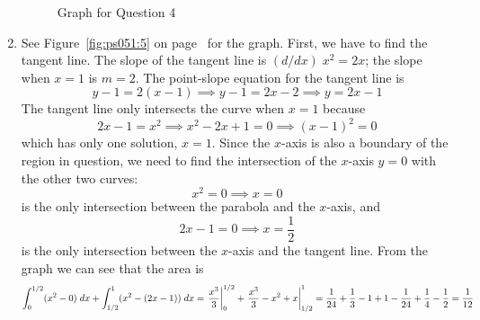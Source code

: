 \documentclass{article}
\begin{document}
\begin{enumerate}
\begin{figure}[htbp]
    \caption{Graph for Question 4}
    \label{fig:ps051:4}
  \end{figure}
\item See Figure~\ref{fig:ps051:5} on page~\pageref{fig:ps051:5} for
  the graph.  First, we have to find the tangent line.  The slope of
  the tangent line is $(d/dx)\; x^2 = 2x$; the slope when $x=1$ is $m=2$.
  The point-slope equation for the tangent line is
  \begin{equation*}
    y - 1 = 2(x-1) \implies y-1 = 2x - 2 \implies y = 2x-1
  \end{equation*}
  The tangent line only intersects the curve when $x=1$ because
  \begin{equation*}
    2x-1 = x^2 \implies x^2 - 2x + 1 = 0 \implies (x-1)^2 = 0
  \end{equation*}
  which has only one solution, $x=1$.  Since the $x$-axis is also a
  boundary of the region in question, we need to find the intersection
  of the $x$-axis $y=0$ with the other two curves:
  \begin{equation*}
    x^2 = 0 \implies x=0
  \end{equation*}
  is the only intersection between the parabola and the $x$-axis, and
  \begin{equation*}
    2x-1 = 0 \implies x= \frac{1}{2}
  \end{equation*}
  is the only intersection between the $x$-axis and the tangent line.
  From the graph we can see that the area is
  \begin{equation*}
    \int_0^{1/2} (x^2 - 0) \; dx
    + \int_{1/2}^1 (x^2 - (2x-1)) \; dx
    = \left. \vphantom{\int} \frac{x^3}{3} \right|_0^{1/2}
    + \left. \vphantom{\int} \frac{x^3}{3} - x^2 + x \right|_{1/2}^1
    = \frac{1}{24} + \frac{1}{3} - 1 + 1 - \frac{1}{24} + \frac{1}{4}
    - \frac{1}{2}
    = \frac{1}{12}
  \end{equation*}
  \begin{figure}[htbp]
    \centering
\end{figure}
\end{enumerate}
\end{document}
